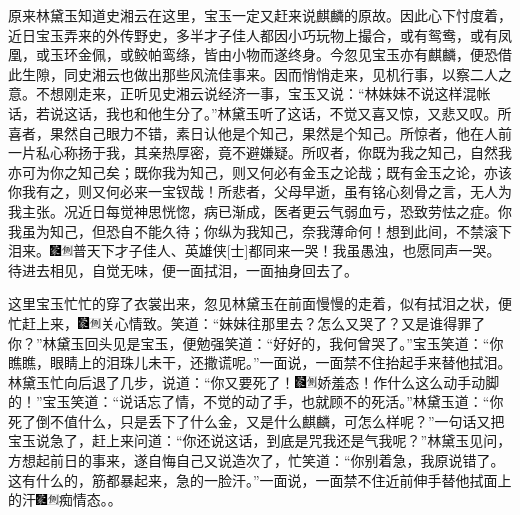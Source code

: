 原来林黛玉知道史湘云在这里，宝玉一定又赶来说麒麟的原故。因此心下忖度着，近日宝玉弄来的外传野史，多半才子佳人都因小巧玩物上撮合，或有鸳鸯，或有凤凰，或玉环金佩，或鲛帕鸾绦，皆由小物而遂终身。今忽见宝玉亦有麒麟，便恐借此生隙，同史湘云也做出那些风流佳事来。因而悄悄走来，见机行事，以察二人之意。不想刚走来，正听见史湘云说经济一事，宝玉又说：``林妹妹不说这样混帐话，若说这话，我也和他生分了。''林黛玉听了这话，不觉又喜又惊，又悲又叹。所喜者，果然自己眼力不错，素日认他是个知己，果然是个知己。所惊者，他在人前一片私心称扬于我，其亲热厚密，竟不避嫌疑。所叹者，你既为我之知己，自然我亦可为你之知己矣；既你我为知己，则又何必有金玉之论哉；既有金玉之论，亦该你我有之，则又何必来一宝钗哉！所悲者，父母早逝，虽有铭心刻骨之言，无人为我主张。况近日每觉神思恍惚，病已渐成，医者更云气弱血亏，恐致劳怯之症。你我虽为知己，但恐自不能久待；你纵为我知己，奈我薄命何！想到此间，不禁滚下泪来。{\includegraphics[width=3mm]{../Images/00006}\includegraphics[width=3mm]{../Images/00011}\footnotesize \kaishu 普天下才子佳人、英雄侠{[}士{]}都同来一哭！我虽愚浊，也愿同声一哭。}待进去相见，自觉无味，便一面拭泪，一面抽身回去了。

这里宝玉忙忙的穿了衣裳出来，忽见林黛玉在前面慢慢的走着，似有拭泪之状，便忙赶上来，{\includegraphics[width=3mm]{../Images/00006}\includegraphics[width=3mm]{../Images/00011}\footnotesize \kaishu 关心情致。}笑道：``妹妹往那里去？怎么又哭了？又是谁得罪了你？''林黛玉回头见是宝玉，便勉强笑道：``好好的，我何曾哭了。''宝玉笑道：``你瞧瞧，眼睛上的泪珠儿未干，还撒谎呢。''一面说，一面禁不住抬起手来替他拭泪。林黛玉忙向后退了几步，说道：``你又要死了！{\includegraphics[width=3mm]{../Images/00006}\includegraphics[width=3mm]{../Images/00011}\footnotesize \kaishu 娇羞态！}作什么这么动手动脚的！''宝玉笑道：``说话忘了情，不觉的动了手，也就顾不的死活。''林黛玉道：``你死了倒不值什么，只是丢下了什么金，又是什么麒麟，可怎么样呢？''一句话又把宝玉说急了，赶上来问道：``你还说这话，到底是咒我还是气我呢？''林黛玉见问，方想起前日的事来，遂自悔自己又说造次了，忙笑道：``你别着急，我原说错了。这有什么的，筋都暴起来，急的一脸汗。''一面说，一面禁不住近前伸手替他拭面上的汗{\includegraphics[width=3mm]{../Images/00006}\includegraphics[width=3mm]{../Images/00011}\footnotesize \kaishu 痴情态。}。


